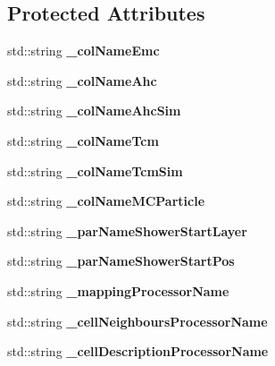 \subsection*{Protected Attributes}
\begin{DoxyCompactItemize}
\item 
std\-::string {\bfseries \-\_\-col\-Name\-Emc}\label{classCALICE_1_1EventDisplayProcessor_a1efe06a3acf7c317dcfb1d5822c03e68}

\item 
std\-::string {\bfseries \-\_\-col\-Name\-Ahc}\label{classCALICE_1_1EventDisplayProcessor_a8ff444f1b4b4e64a5ea06e30e4f8accf}

\item 
std\-::string {\bfseries \-\_\-col\-Name\-Ahc\-Sim}\label{classCALICE_1_1EventDisplayProcessor_af630ea20517ca82a2e48f59cce5eaf05}

\item 
std\-::string {\bfseries \-\_\-col\-Name\-Tcm}\label{classCALICE_1_1EventDisplayProcessor_a9a05be2ec278b8ec385b7b41957024aa}

\item 
std\-::string {\bfseries \-\_\-col\-Name\-Tcm\-Sim}\label{classCALICE_1_1EventDisplayProcessor_aa5fe137ac3cba3ee963303fc38444cca}

\item 
std\-::string {\bfseries \-\_\-col\-Name\-M\-C\-Particle}\label{classCALICE_1_1EventDisplayProcessor_a7169df856c690f8a76210cf49be08b95}

\item 
std\-::string {\bfseries \-\_\-par\-Name\-Shower\-Start\-Layer}\label{classCALICE_1_1EventDisplayProcessor_afd62efd0e2ac21fb8d69196b2ad1007c}

\item 
std\-::string {\bfseries \-\_\-par\-Name\-Shower\-Start\-Pos}\label{classCALICE_1_1EventDisplayProcessor_a5c8b338ab8395474cdfe6e1ae97828ac}

\item 
std\-::string {\bfseries \-\_\-mapping\-Processor\-Name}\label{classCALICE_1_1EventDisplayProcessor_a7e2048023fb976e1ad4595143e82c2eb}

\item 
std\-::string {\bfseries \-\_\-cell\-Neighbours\-Processor\-Name}\label{classCALICE_1_1EventDisplayProcessor_a7a6c899ee6fed94746b5bed528908523}

\item 
std\-::string {\bfseries \-\_\-cell\-Description\-Processor\-Name}\label{classCALICE_1_1EventDisplayProcessor_a28820140d1bc43b3f09f9b507f19867a}


\end{DoxyCompactItemize}
